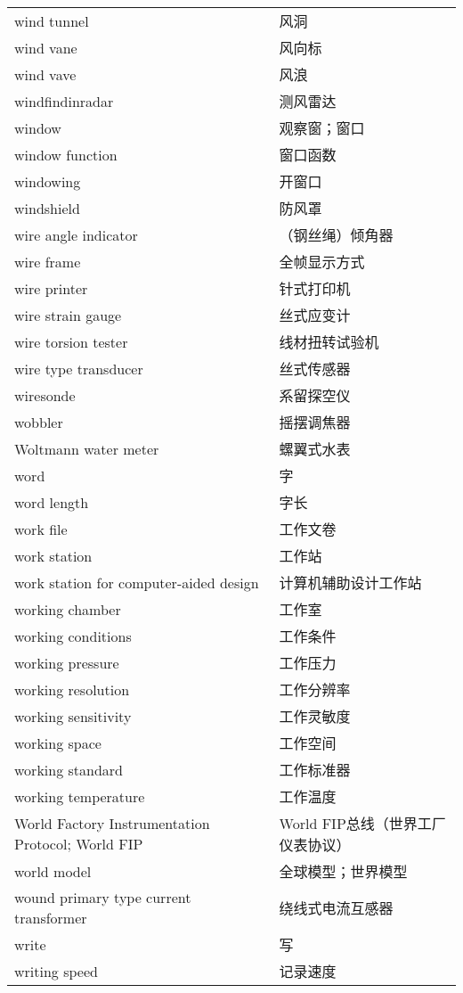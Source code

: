 \documentclass[
]{article}
\begin{document}
\begin{longtable}[]{@{}ll@{}}
wind tunnel & 风洞 \\
wind vane & 风向标 \\
wind vave & 风浪 \\
windfindinradar & 测风雷达 \\
window & 观察窗；窗口 \\
window function & 窗口函数 \\
windowing & 开窗口 \\
windshield & 防风罩 \\
wire angle indicator & （钢丝绳）倾角器 \\
wire frame & 全帧显示方式 \\
wire printer & 针式打印机 \\
wire strain gauge & 丝式应变计 \\
wire torsion tester & 线材扭转试验机 \\
wire type transducer & 丝式传感器 \\
wiresonde & 系留探空仪 \\
wobbler & 摇摆调焦器 \\
Woltmann water meter & 螺翼式水表 \\
word & 字 \\
word length & 字长 \\
work file & 工作文卷 \\
work station & 工作站 \\
work station for computer-aided design & 计算机辅助设计工作站 \\
working chamber & 工作室 \\
working conditions & 工作条件 \\
working pressure & 工作压力 \\
working resolution & 工作分辨率 \\
working sensitivity & 工作灵敏度 \\
working space & 工作空间 \\
working standard & 工作标准器 \\
working temperature & 工作温度 \\
World Factory Instrumentation Protocol; World FIP & World
FIP总线（世界工厂仪表协议） \\
world model & 全球模型；世界模型 \\
wound primary type current transformer & 绕线式电流互感器 \\
write & 写 \\
writing speed & 记录速度 \\
\bottomrule()
\end{longtable}
\end{document}
